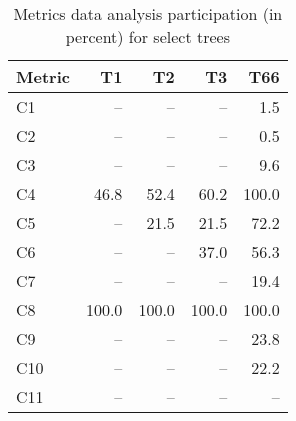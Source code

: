 
\begin{table}[t]
	\centering
	\caption{Metrics data analysis participation (in percent) for select trees }
	\label{tab:participation}
	\small
	\begin{tabular}{lrrrr}
	Metric 	& T1 	& T2	& T3 	& T66 	\\ 
	\hline
	C1 		& --	& --	& -- 	& 1.5	\\
	C2 		& -- 	& --	& -- 	& 0.5	\\
	C3 		& -- 	& -- 	& -- 	& 9.6	\\
	\rowcolor{light-light-gray}
	C4 		& 46.8	& 52.4	& 60.2	& 100.0	\\
	\rowcolor{light-light-gray}
	C5 		& -- 	& 21.5	& 21.5	& 72.2	\\
	\rowcolor{light-light-gray}
	C6 		& -- 	& -- 	& 37.0	& 56.3	\\
	C7 		& -- 	& -- 	& -- 	& 19.4	\\
	\rowcolor{light-light-gray}
	C8 		& 100.0	& 100.0	& 100.0	& 100.0	\\
	C9 		& -- 	& -- 	& --	& 23.8	\\
	C10		& -- 	& -- 	& -- 	& 22.2	\\
	C11		& -- 	& -- 	& -- 	& -- 	\\
	\hline
	\end{tabular}
\end{table}


